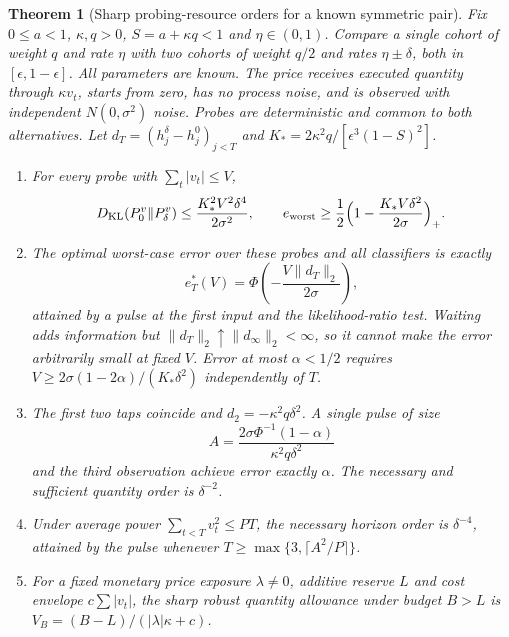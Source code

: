 \documentclass[12pt]{article}
\newtheorem{theorem}{Theorem}[section]
\theoremstyle{definition}
\theoremstyle{remark}
\newcommand{\KL}{D_{\mathrm{KL}}}
\begin{document}
\begin{theorem}[Sharp probing-resource orders for a known symmetric pair]\label{thm:quantity}
Fix $0\le a<1$, $\kappa,q>0$, $S=a+\kappa q<1$ and $\eta\in(0,1)$. Compare a single cohort of weight $q$ and rate $\eta$ with two cohorts of weight $q/2$ and rates $\eta\pm\delta$, both in $[\epsilon,1-\epsilon]$. All parameters are known. The price receives executed quantity through $\kappa v_t$, starts from zero, has no process noise, and is observed with independent $N(0,\sigma^2)$ noise. Probes are deterministic and common to both alternatives. Let $d_T=(h^\delta_j-h^0_j)_{j<T}$ and $K_*=2\kappa^2q/[\epsilon^3(1-S)^2]$.
\begin{enumerate}[label=(\roman*)]
\item For every probe with $\sum_t|v_t|\le V$,
\begin{equation}\label{eq:klV}
\KL(P_0^v\|P_\delta^v)\le\frac{K_*^2V^2\delta^4}{2\sigma^2},\qquad e_{\rm worst}\ge\frac12\Bigl(1-\frac{K_*V\delta^2}{2\sigma}\Bigr)_+ .
\end{equation}
\item The optimal worst-case error over these probes and all classifiers is exactly
\begin{equation}\label{eq:exacterr}
e^*_T(V)=\Phi\!\left(-\frac{V\|d_T\|_2}{2\sigma}\right),
\end{equation}
attained by a pulse at the first input and the likelihood-ratio test. Waiting adds information but $\|d_T\|_2\uparrow\|d_\infty\|_2<\infty$, so it cannot make the error arbitrarily small at fixed $V$. Error at most $\alpha<1/2$ requires $V\ge2\sigma(1-2\alpha)/(K_*\delta^2)$ independently of $T$.
\item The first two taps coincide and $d_2=-\kappa^2q\delta^2$. A single pulse of size
\begin{equation}\label{eq:pulse}
A=\frac{2\sigma\Phi^{-1}(1-\alpha)}{\kappa^2q\delta^2}
\end{equation}
and the third observation achieve error exactly $\alpha$. The necessary and sufficient quantity order is $\delta^{-2}$.
\item Under average power $\sum_{t<T}v_t^2\le PT$, the necessary horizon order is $\delta^{-4}$, attained by the pulse whenever $T\ge\max\{3,\lceil A^2/P\rceil\}$.
\item For a fixed monetary price exposure $\lambda\neq0$, additive reserve $L$ and cost envelope $c\sum|v_t|$, the sharp robust quantity allowance under budget $B>L$ is $V_B=(B-L)/(|\lambda|\kappa+c)$.
\end{enumerate}
\end{theorem}
\end{document}
